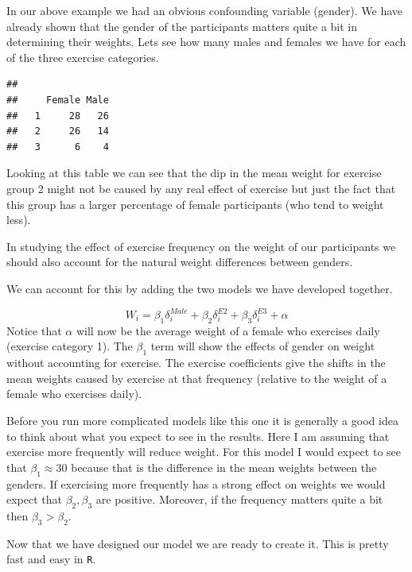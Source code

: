 \documentclass[
]{book}
\newenvironment{Shaded}{\begin{snugshade}}{\end{snugshade}}
\newcommand{\FunctionTok}[1]{\textcolor[rgb]{0.00,0.00,0.00}{#1}}
\newcommand{\NormalTok}[1]{#1}
\newcommand{\SpecialCharTok}[1]{\textcolor[rgb]{0.00,0.00,0.00}{#1}}
\theoremstyle{definition}
\theoremstyle{definition}
\theoremstyle{definition}
\theoremstyle{definition}
\theoremstyle{remark}
\begin{document}
In our above example we had an obvious confounding variable (gender). We have already shown that the gender of the participants matters quite a bit in determining their weights. Lets see how many males and females we have for each of the three exercise categories.

\begin{Shaded}
\end{Shaded}

\begin{verbatim}
##    
##     Female Male
##   1     28   26
##   2     26   14
##   3      6    4
\end{verbatim}

Looking at this table we can see that the dip in the mean weight for exercise group 2 might not be caused by any real effect of exercise but just the fact that this group has a larger percentage of female participants (who tend to weight less).

In studying the effect of exercise frequency on the weight of our participants we should also account for the natural weight differences between genders.

We can account for this by adding the two models we have developed together.

\[W_i=\beta_1 \delta_i^{Male}+\beta_2 \delta_i^{E2}+\beta_3 \delta_i^{E3}+\alpha\]
Notice that \(\alpha\) will now be the average weight of a female who exercises daily (exercise category 1). The \(\beta_1\) term will show the effects of gender on weight without accounting for exercise. The exercise coefficients give the shifts in the mean weights caused by exercise at that frequency (relative to the weight of a female who exercises daily).

Before you run more complicated models like this one it is generally a good idea to think about what you expect to see in the results. Here I am assuming that exercise more frequently will reduce weight. For this model I would expect to see that \(\beta_1\approx 30\) because that is the difference in the mean weights between the genders. If exercising more frequently has a strong effect on weights we would expect that \(\beta_2, \beta_3\) are positive. Moreover, if the frequency matters quite a bit then \(\beta_3>\beta_2\).

Now that we have designed our model we are ready to create it. This is pretty fast and easy in \texttt{R}.
\end{document}
